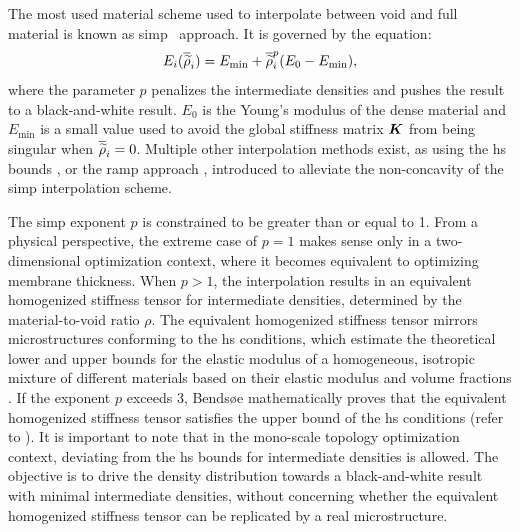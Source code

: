 The most used material scheme used to interpolate between void and full material is known as \gls{simp}~ approach. It is governed by the equation:
\begin{equation}
    E_i(\overline{\widetilde{\rho}}_i) = E_{\textrm{min}} + \overline{\widetilde{\rho}}_i^p(E_0-E_{\textrm{min}}),
    \label{eq:02_simp}
\end{equation}
where the parameter $p$ penalizes the intermediate densities and pushes the result to a black-and-white result. $E_0$ is the Young's modulus of the dense material and $E_{\textrm{min}}$ is a small value used to avoid the global stiffness matrix $\bm{K}$ from being singular when $\overline{\widetilde{\rho}}_i=0$. Multiple other interpolation methods exist, as using the \gls{hs} bounds \cite{bendsoe_material_1999}, or the \gls{ramp} approach , introduced to alleviate the non-concavity of the \gls{simp} interpolation scheme. 

The \gls{simp} exponent $p$ is constrained to be greater than or equal to 1. From a physical perspective, the extreme case of $p = 1$ makes sense only in a two-dimensional optimization context, where it becomes equivalent to optimizing membrane thickness. When $p > 1$, the interpolation results in an equivalent homogenized stiffness tensor for intermediate densities, determined by the material-to-void ratio $\rho$. The equivalent homogenized stiffness tensor mirrors microstructures conforming to the \gls{hs} conditions, which estimate the theoretical lower and upper bounds for the elastic modulus of a homogeneous, isotropic mixture of different materials based on their elastic modulus and volume fractions . If the exponent $p$ exceeds 3, Bendsøe  mathematically proves that the equivalent homogenized stiffness tensor satisfies the upper bound of the \gls{hs} conditions (refer to ). It is important to note that in the mono-scale topology optimization context, deviating from the \gls{hs} bounds for intermediate densities is allowed. The objective is to drive the density distribution towards a black-and-white result with minimal intermediate densities, without concerning whether the equivalent homogenized stiffness tensor can be replicated by a real microstructure.

